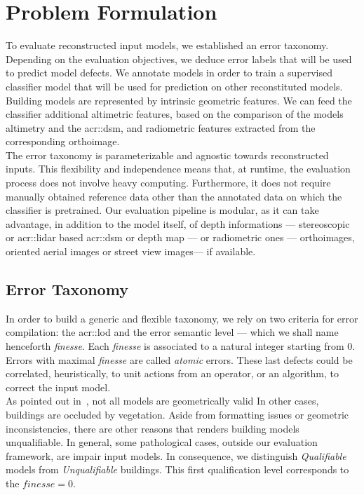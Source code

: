 \documentclass[runningheads]{llncs}
\begin{document}
\section{Problem Formulation}
To evaluate reconstructed input models, we established an error taxonomy. Depending on the evaluation objectives, we deduce error labels that will be used to predict model defects. We annotate models in order to train a supervised classifier model that will be used for prediction on other reconstituted models. Building models are represented by intrinsic geometric features. We can feed the classifier additional altimetric features, based on the comparison of the models altimetry and the \acrshort{acr::dsm}, and radiometric features extracted from the corresponding orthoimage.\\

The error taxonomy is parameterizable and agnostic towards reconstructed inputs. This flexibility and independence means that, at runtime, the evaluation process does not involve heavy computing. Furthermore, it does not require manually obtained reference data other than the annotated data on which the classifier is pretrained. Our evaluation pipeline is modular, as it can take advantage, in addition to the model itself, of depth informations --- stereoscopic or \acrfull{acr::lidar} based \acrshort{acr::dsm} or depth map  --- or radiometric ones --- orthoimages, oriented aerial images or street view images--- if available.
\subsection{Error Taxonomy}
In order to build a generic and flexible taxonomy, we rely on two criteria for error compilation: the \acrshort{acr::lod} and the error semantic level --- which we shall name henceforth \textit{finesse}. Each \textit{finesse} is associated to a natural integer starting from $0$. Errors with maximal \textit{finesse} are called \textit{atomic} errors. These last defects could be correlated, heuristically, to unit actions from an operator, or an algorithm, to correct the input model.\\

As pointed out in~\cite{ledoux2018val3dity}, not all models are geometrically valid In other cases, buildings are occluded by vegetation. Aside from formatting issues or geometric inconsistencies, there are other reasons that renders building models unqualifiable. In general, some pathological cases, outside our evaluation framework, are impair input models. In consequence, we distinguish \textit{Qualifiable} models from \textit{Unqualifiable} buildings. This first qualification level corresponds to the $\textit{finesse} = 0$. 
\end{document}
